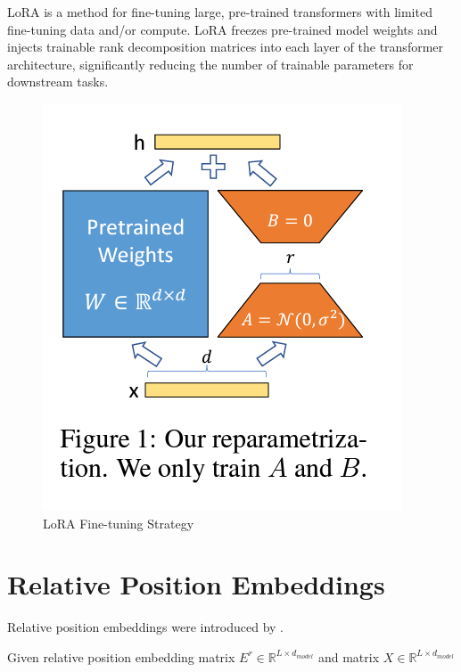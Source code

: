 \documentclass[11pt]{article}
\theoremstyle{definition}
\begin{document}
LoRA is a method for fine-tuning large, pre-trained transformers with limited fine-tuning data and/or compute. LoRA freezes pre-trained model weights and injects trainable rank decomposition matrices into each layer of the transformer architecture, significantly reducing the number of trainable parameters for downstream tasks.

\begin{figure}
\centering
  \includegraphics[keepaspectratio]{transformers/lora_overview.png}
  \caption{LoRA Fine-tuning Strategy \cite{DBLP:journals/corr/abs-2106-09685}}
  \label{fig:lora-overview}
\end{figure}

\section{Relative Position Embeddings}

Relative position embeddings were introduced by \cite{shaw2018selfattention}.

Given relative position embedding matrix $E^r \in \mathbb{R}^{L \times d_{model}}$ and matrix $X \in \mathbb{R}^{L \times d_{model}}$
\end{document}
